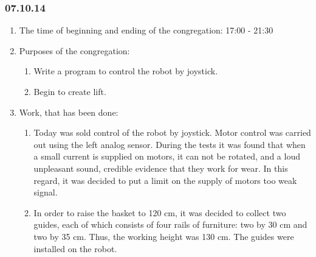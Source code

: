 
\subsubsection{07.10.14}

\begin{enumerate}
	\item The time of beginning and ending of the congregation:
	17:00 - 21:30
	\item Purposes of the congregation:
	\begin{enumerate}
	  \item Write a program to control the robot by joystick.
	  
	  \item Begin to create lift.
	  
    \end{enumerate}
	\item Work, that has been done:
	\begin{enumerate}
	  \item Today was sold control of the robot by joystick. Motor control was carried out using the left analog sensor. During the tests it was found that when a small current is supplied on motors, it can not be rotated, and a loud unpleasant sound, credible evidence that they work for wear. In this regard, it was decided to put a limit on the supply of motors too weak signal.
      
      \item  In order to raise the basket to 120 cm, it was decided to collect two guides, each of which consists of four rails of furniture: two by 30 cm and two by 35 cm. Thus, the working height was 130 cm. The guides were installed on the robot.
      

\end{enumerate}
\end{enumerate}
